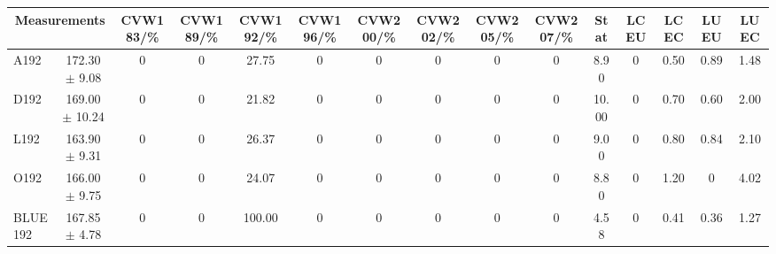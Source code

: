 \begin{table}[H]
\scriptsize
\begin{center}
\renewcommand{\arraystretch}{1.1}
\begin{tabular}{|lc|c|c|c|c|c|c|c|c|ccccc|}
\hline
\multicolumn{2}{|c|}{Measurements} & CVW{\tiny 183}/\%  & CVW{\tiny 189}/\%  & CVW{\tiny 192}/\%  & CVW{\tiny 196}/\%  & CVW{\tiny 200}/\%  & CVW{\tiny 202}/\%  & CVW{\tiny 205}/\%  & CVW{\tiny 207}/\%  & {\tiny Stat} & {\tiny LCEU} & {\tiny LCEC} & {\tiny LUEU} & {\tiny LUEC}\\
\hline
A192 &     172.30 $\pm$       9.08 &  0 &  0 &      27.75 &  0 &  0 &  0 &  0 &  0 &       8.90 &  0 &       0.50 &       0.89 &       1.48\\
D192 &     169.00 $\pm$      10.24 &  0 &  0 &      21.82 &  0 &  0 &  0 &  0 &  0 &      10.00 &  0 &       0.70 &       0.60 &       2.00\\
L192 &     163.90 $\pm$       9.31 &  0 &  0 &      26.37 &  0 &  0 &  0 &  0 &  0 &       9.00 &  0 &       0.80 &       0.84 &       2.10\\
O192 &     166.00 $\pm$       9.75 &  0 &  0 &      24.07 &  0 &  0 &  0 &  0 &  0 &       8.80 &  0 &       1.20 &  0 &       4.02\\
\hline
BLUE {\tiny 192} &     167.85 $\pm$       4.78 &  0 &  0 &     100.00 &  0 &  0 &  0 &  0 &  0 &       4.58 &  0 &       0.41 &       0.36 &       1.27\\
\hline
\end{tabular}
\renewcommand{\arraystretch}{1}
\end{center}
\end{table}
\vspace*{-0.5cm}
